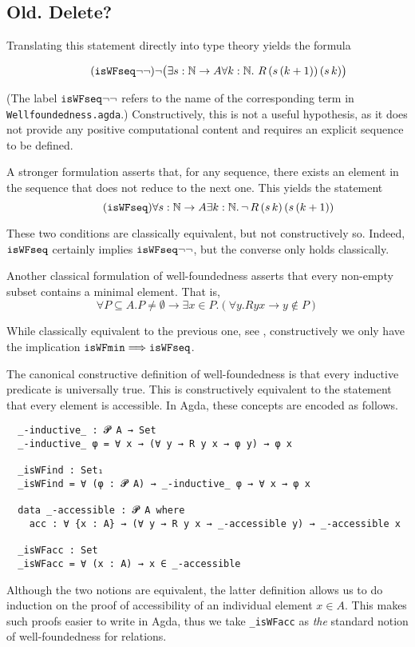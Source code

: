 \subsection{Old. Delete?}

Translating this statement directly into type theory yields the formula

\[\tag{$\isWFseqm$} \lnot \big(\exists s : \nat \to A \forall k : \nat. \  R \,(s\,(k+1)) \, (s\, k) \big) \]

(The label $\mathtt{isWFseq}{\lnot\lnot}$ refers to the name of the corresponding term in \texttt{Wellfoundedness.agda}.)
Constructively, this is not a useful hypothesis, as it does not provide any positive computational content and requires an explicit sequence to be defined.

A stronger formulation asserts that, for any sequence, there exists an element
in the sequence that does not reduce to the next one.  This yields the statement
\[\tag{$\isWFseq$} \forall s : \nat \to A \exists k : \nat.\, \lnot \, R \,(s\,k)\,(s\,(k+1)) \]

These two conditions are classically equivalent, but not constructively so.
Indeed, $\mathtt{isWFseq}$ certainly implies $\mathtt{isWFseq}{\lnot\lnot}$, but the converse only holds classically.

Another classical formulation of well-foundedness
asserts that every non-empty subset
contains a minimal element.  That is,
\[ \tag{$\isWFmin$} \forall P \subseteq A. P \neq \emptyset \to \exists x \in P. (\forall y. Ryx \to y\notin P) \]

While classically equivalent to the previous one, see \cite[Exercise A.1.8]{Terese},
constructively we only have the implication $\mathtt{isWFmin} \Longrightarrow \mathtt{isWFseq}$.

The canonical constructive definition of well-foundedness is that
every inductive predicate is universally true.
This is constructively equivalent to the statement that every element
is accessible.  In Agda, these concepts are encoded as follows.
{\small
\begin{verbatim}
  _-inductive_ : 𝓟 A → Set
  _-inductive_ φ = ∀ x → (∀ y → R y x → φ y) → φ x

  _isWFind : Set₁
  _isWFind = ∀ (φ : 𝓟 A) → _-inductive_ φ → ∀ x → φ x

  data _-accessible : 𝓟 A where
    acc : ∀ {x : A} → (∀ y → R y x → _-accessible y) → _-accessible x

  _isWFacc : Set
  _isWFacc = ∀ (x : A) → x ∈ _-accessible
\end{verbatim}
}
Although the two notions are equivalent, the latter definition allows us to do induction on the proof of accessibility of an individual element $x \in A$.  This makes such proofs easier to write in Agda, thus we take
\verb|_isWFacc| as \emph{the} standard notion of well-foundedness for relations.

